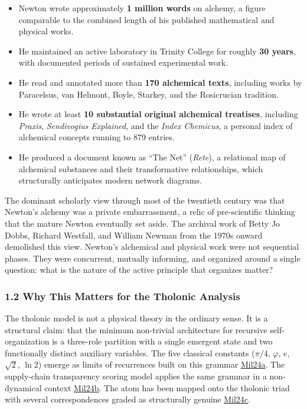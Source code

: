 \documentclass[
  11pt,
  letterpaper,
]{article}
\providecommand{\tightlist}{%
  \setlength{\itemsep}{0pt}\setlength{\parskip}{0pt}}
\begin{document}
\begin{itemize}
\tightlist
\item
  Newton wrote approximately \textbf{1 million words} on alchemy, a
  figure comparable to the combined length of his published mathematical
  and physical works.
\item
  He maintained an active laboratory in Trinity College for roughly
  \textbf{30 years}, with documented periods of sustained experimental
  work.
\item
  He read and annotated more than \textbf{170 alchemical texts},
  including works by Paracelsus, van Helmont, Boyle, Starkey, and the
  Rosicrucian tradition.
\item
  He wrote at least \textbf{10 substantial original alchemical
  treatises}, including \emph{Praxis}, \emph{Sendivogius Explained}, and
  the \emph{Index Chemicus}, a personal index of alchemical concepts
  running to 879 entries.
\item
  He produced a document known as ``The Net'' (\emph{Rete}), a
  relational map of alchemical substances and their transformative
  relationships, which structurally anticipates modern network diagrams.
\end{itemize}

The dominant scholarly view through most of the twentieth century was
that Newton's alchemy was a private embarrassment, a relic of
pre-scientific thinking that the mature Newton eventually set aside. The
archival work of Betty Jo Dobbs, Richard Westfall, and William Newman
from the 1970s onward demolished this view. Newton's alchemical and
physical work were not sequential phases. They were concurrent, mutually
informing, and organized around a single question: what is the nature of
the active principle that organizes matter?

\subsubsection{1.2 Why This Matters for the Tholonic
Analysis}\label{why-this-matters-for-the-tholonic-analysis}

The tholonic model is not a physical theory in the ordinary sense. It is
a structural claim: that the minimum non-trivial architecture for
recursive self-organization is a three-role partition with a single
emergent state and two functionally distinct auxiliary variables. The
five classical constants (\(\pi/4\), \(\varphi\), \(e\), \(\sqrt{2}\),
\(\ln 2\)) emerge as limits of recurrences built on this grammar
\href{https://github.com/baardev/truevalue/blob/main/docnav/Research/papers/1_recursive-tholonic-five-constants/1_recursive-tholonic-five-constants.pdf}{Mil24a}.
The supply-chain transparency scoring model applies the same grammar in
a non-dynamical context
\href{https://github.com/baardev/truevalue/blob/main/docnav/Research/papers/2_supply-chain-transparency-tvpci/2_supply-chain-transparency-tvpci.pdf}{Mil24b}.
The atom has been mapped onto the tholonic triad with several
correspondences graded as structurally genuine
\href{https://github.com/baardev/truevalue/blob/main/docnav/Research/papers/8_atom-as-tholon-measurable-phenomena/8_atom-as-tholon-measurable-phenomena.pdf}{Mil24c}.
\end{document}
